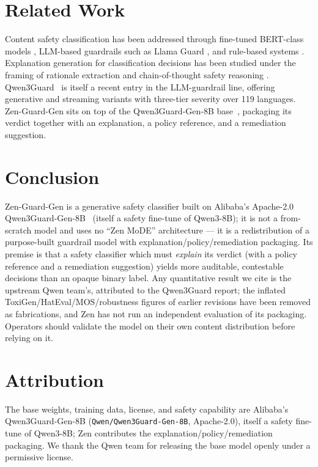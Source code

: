 \documentclass[11pt,a4paper]{article}
\begin{document}
\section{Related Work}

Content safety classification has been addressed through fine-tuned BERT-class models \cite{perspective}, LLM-based guardrails such as Llama Guard \cite{llmguard}, and rule-based systems \cite{cld}. Explanation generation for classification decisions has been studied under the framing of rationale extraction \cite{rationale} and chain-of-thought safety reasoning \cite{cot_safety}. Qwen3Guard~\cite{qwen3guard} is itself a recent entry in the LLM-guardrail line, offering generative and streaming variants with three-tier severity over 119 languages. Zen-Guard-Gen sits on top of the Qwen3Guard-Gen-8B base~\cite{qwen3guard}, packaging its verdict together with an explanation, a policy reference, and a remediation suggestion.

\section{Conclusion}

Zen-Guard-Gen is a generative safety classifier built on Alibaba's Apache-2.0 Qwen3Guard-Gen-8B~\cite{qwen3guard} (itself a safety fine-tune of Qwen3-8B); it is not a from-scratch model and uses no ``Zen MoDE'' architecture --- it is a redistribution of a purpose-built guardrail model with explanation/policy/remediation packaging. Its premise is that a safety classifier which must \emph{explain} its verdict (with a policy reference and a remediation suggestion) yields more auditable, contestable decisions than an opaque binary label. Any quantitative result we cite is the upstream Qwen team's, attributed to the Qwen3Guard report; the inflated ToxiGen/HatEval/MOS/robustness figures of earlier revisions have been removed as fabrications, and Zen has not run an independent evaluation of its packaging. Operators should validate the model on their own content distribution before relying on it.

\section*{Attribution}

The base weights, training data, license, and safety capability are Alibaba's Qwen3Guard-Gen-8B (\texttt{Qwen/Qwen3Guard-Gen-8B}, Apache-2.0), itself a safety fine-tune of Qwen3-8B; Zen contributes the explanation/policy/remediation packaging. We thank the Qwen team for releasing the base model openly under a permissive license.
\end{document}
